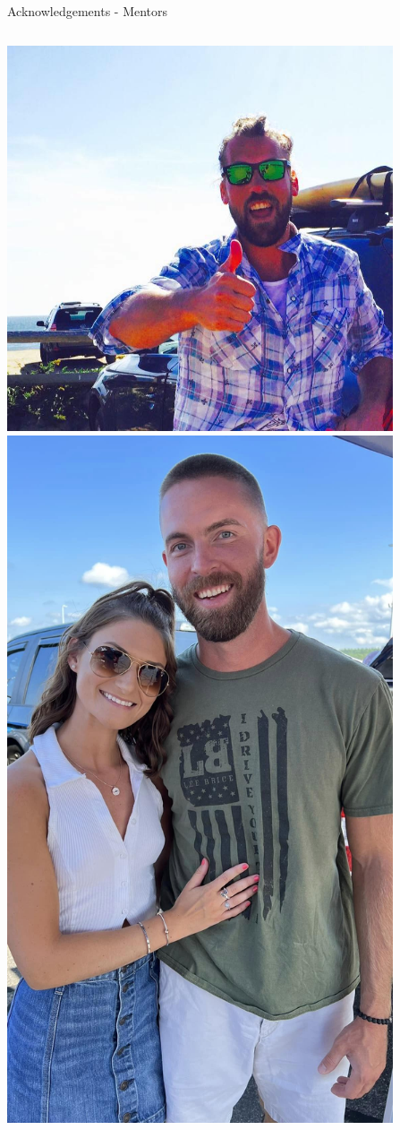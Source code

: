 \documentclass[aspectratio=169]{beamer}
\begin{document}
\begin{frame}{Acknowledgements - Mentors}
\begin{columns}
            \centering
            \includegraphics[width=0.855\textwidth]{people/docs/jon.png}
            \includegraphics[width=0.855\textwidth]{people/docs/stravinsky.png}

\end{columns}
\end{frame}
\end{document}
